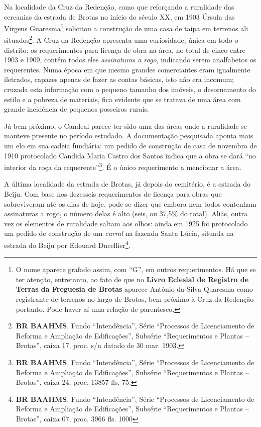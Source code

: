 Na localidade da Cruz da Redenção, como que reforçando a ruralidade das cercanias da estrada de Brotas no início do século XX, em 1903 Úrsula das Virgens Guaresma\footnote{O nome aparece grafado assim, com ``G'', em outros requerimentos. Há que se ter atenção, entretanto, ao fato de que no \textbf{Livro Eclesial de Registro de Terras da Freguesia de Brotas} aparece Antônio da Silva Quaresma como registrante de terrenos no largo de Brotas, bem próximo à Cruz da Redenção portanto. Pode haver aí uma relação de parentesco.} solicitou a construção de uma casa de taipa em terrenos ali situados\footnote{\textbf{BR BAAHMS}, Fundo ``Intendência'', Série ``Processos de Licenciamento de Reforma e Ampliação de Edificações'', Subsérie ``Requerimentos e Plantas -- Brotas'', caixa 17, proc. s/n datado de 30 mar. 1903.}. A Cruz da Redenção apresenta uma curiosidade, única em todo o distrito: os requerimentos para licença de obra na área, no total de cinco entre 1903 e 1909, contém todos eles \textit{assinaturas a rogo}, indicando serem analfabetos os requerentes. Numa época em que mesmo grandes comerciantes eram igualmente iletrados, capazes apenas de fazer as contas básicas, isto não era incomum; cruzada esta informação com o pequeno tamanho dos imóveis, o desornamento do estilo e a pobreza de materiais, fica evidente que se tratava de uma área com grande incidência de pequenos posseiros rurais. 

Já bem próximo, o Candeal parece ter sido uma das áreas onde a ruralidade se manteve presente no período estudado. A documentação pesquisada aponta mais um elo em  sua cadeia fundiária: um pedido de construção de casa de novembro de 1910 protocolado Candida Maria Castro dos Santos indica que a obra se dará ``no interior da roça da requerente''\footnote{\textbf{BR BAAHMS}, Fundo ``Intendência'', Série ``Processos de Licenciamento de Reforma e Ampliação de Edificações'', Subsérie ``Requerimentos e Plantas -- Brotas'', caixa 24, proc. 13857 fls. 75.}. É o único requerimento a mencionar a área.

A última localidade da estrada de Brotas, já depois do cemitério, é a estrada do Beiju. Com base nos dezesseis requerimentos de licença para obras que sobreviveram até os dias de hoje, pode-se dizer que embora nem todos contenham assinaturas a rogo, o número delas é alto (seis, ou 37,5\% do total). Aliás, outra vez os elementos de ruralidade saltam aos olhos: ainda em 1925 foi protocolado um pedido de construção de um \textit{curral} na fazenda Santa Lúcia, situada na estrada do Beiju por Edouard Ducellier\footnote{\textbf{BR BAAHMS}, Fundo ``Intendência'', Série ``Processos de Licenciamento de Reforma e Ampliação de Edificações'', Subsérie ``Requerimentos e Plantas -- Brotas'', caixa 07, proc. 3966 fls. 1000}.

